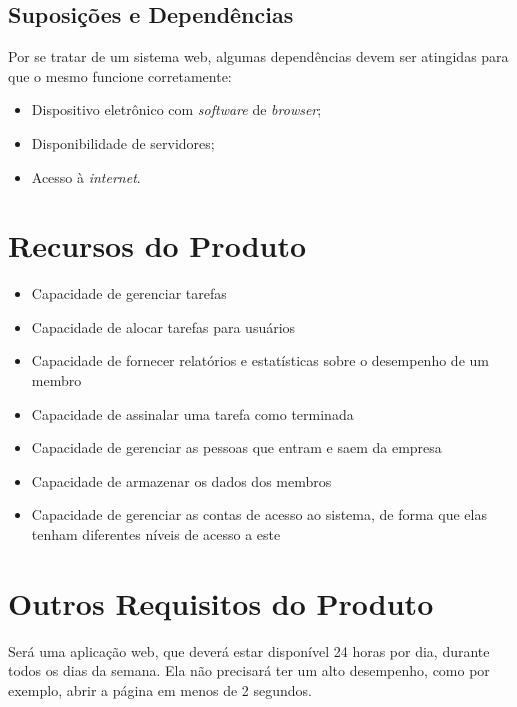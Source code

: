 \begin{apendicesenv}
\subsection{Suposições e Dependências}

Por se tratar de um sistema web, algumas dependências devem ser atingidas para que o mesmo funcione corretamente:

\begin{itemize}
\item Dispositivo eletrônico com \textit{software} de \textit{browser};
\item Disponibilidade de servidores;
\item Acesso à \textit{internet}.
\end{itemize}

\section{Recursos do Produto}

\begin{itemize}
\item Capacidade de gerenciar tarefas
\item Capacidade de alocar tarefas para usuários
\item Capacidade de fornecer relatórios e estatísticas sobre o desempenho de um membro
\item Capacidade de assinalar uma tarefa como terminada
\item Capacidade de gerenciar as pessoas que entram e saem da empresa
\item Capacidade de armazenar os dados dos membros
\item Capacidade de gerenciar as contas de acesso ao sistema, de forma que elas tenham diferentes níveis de acesso a este
\end{itemize}

\section{Outros Requisitos do Produto}

Será uma aplicação web, que deverá estar disponível 24 horas por dia, durante todos os dias da semana.
Ela não precisará ter um alto desempenho, como por exemplo, abrir a página em menos de 2 segundos.






















\end{apendicesenv}
